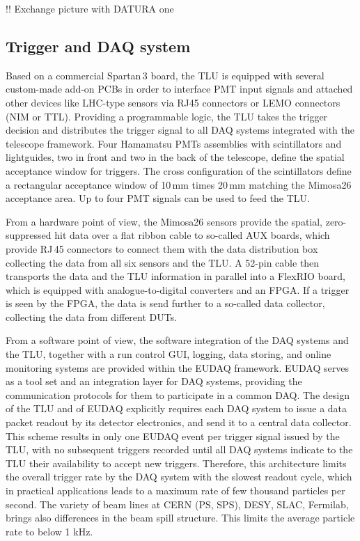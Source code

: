 !! Exchange picture with DATURA one

\subsection{Trigger and DAQ system}

Based on a commercial Spartan\,3 board, the TLU is equipped with several custom-made add-on PCBs in order to interface PMT input signals
 and attached other devices like LHC-type sensors via RJ45 connectors or LEMO connectors (NIM or TTL). 
Providing a programmable logic, the TLU  takes the trigger decision and distributes the trigger signal to all DAQ systems integrated with the telescope framework.
Four Hamamatsu PMTs assemblies with scintillators and lightguides, two in front and two in the back of the telescope, define the spatial acceptance window for triggers. 
The cross configuration of the scintillators define a rectangular acceptance window of 10\,mm times 20\,mm matching the Mimosa26 acceptance area. 
Up to four PMT signals can be used to feed the TLU. 

From a hardware point of view, the Mimosa26 sensors provide the spatial, zero-suppressed hit data over a flat ribbon cable to so-called AUX boards, which provide RJ\,45 connectors to connect them with the
 data distribution box collecting the data from all six sensors and the TLU. 
A 52-pin cable then transports the data and the TLU information in parallel into a FlexRIO board, which is equipped with analogue-to-digital converters and an FPGA. 
If a trigger is seen by the FPGA, the data is send further to a so-called data collector, collecting the data from different DUTs. 

From a software point of view, the software integration of the DAQ systems and the TLU, together with a run control GUI, logging, data storing, and online monitoring systems are provided within the EUDAQ framework. 
EUDAQ serves as a tool set and an integration layer for DAQ systems, providing the communication protocols for them to participate in a common DAQ. 
The design of the TLU and of EUDAQ explicitly requires each DAQ system to issue a data packet readout by its detector electronics, and send it to a central data collector. 
This scheme results in only one EUDAQ event per trigger signal issued by the TLU, with no subsequent triggers recorded until all DAQ systems indicate to the TLU their availability to accept new triggers.
Therefore, this architecture limits the overall trigger rate by the DAQ system with the slowest readout cycle, which in practical applications leads to a maximum rate of few thousand particles per second. 
The variety of beam lines at CERN (PS, SPS), DESY, SLAC, Fermilab, brings also differences in the beam spill structure. 
This limits the average particle rate to below 1 kHz. 

